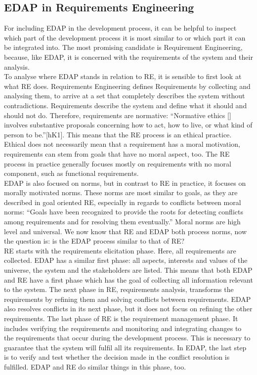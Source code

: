 \subsection*{EDAP in Requirements Engineering}
For including EDAP in the development process, it can be helpful to inspect which part of the development process it is most similar to or which part it can be integrated into. The most promising candidate is Requirement Engineering, because, like EDAP, it is concerned with the requirements of the system and their analysis. \\
To analyse where EDAP stands in relation to RE, it is sensible to first look at what RE does. Requirements Engineering defines Requirements by collecting and analysing them, to arrive at a set that completely describes the system without contradictions. Requirements describe the system and define what it should and should not do. Therefore, requirements are normative: “Normative ethics [] involves substantive proposals concerning how to act, how to live, or what kind of person to be.”[hK1]. This means that the RE process is an ethical practice. Ethical does not necessarily mean that a requirement has a moral motivation, requirements can stem from goals that have no moral aspect, too. The RE process in practice generally focuses mostly on requirements with no moral component, such as functional requirements.\\
EDAP is also focused on norms, but in contrast to RE in practice, it focuses on morally motivated norms. These norms are most similar to goals, as they are described in goal oriented RE, especially in regards to conflicts between moral norms:  “Goals have been recognized to provide the roots for detecting conflicts among requirements and for resolving them eventually.”\cite{van2001goal:2} Moral norms are high level and universal. We now know that RE and EDAP both process norms, now the question is: is the EDAP process similar to that of RE?\\
RE starts with the requirements elicitation phase. Here, all requirements are collected. EDAP has a similar first phase: all aspects, interests and values of the universe, the system and the stakeholders are listed. This means that both EDAP and RE have a first phase which has the goal of collecting all information relevant to the system. The next phase in RE, requirements analysis, transforms the requirements by refining them and solving conflicts between requirements. EDAP also resolves conflicts in its next phase, but it does not focus on refining the other requirements. The last phase of RE is the requirement management phase. It includes verifying the requirements and monitoring and integrating changes to the requirements that occur during the development process. This is necessary to guarantee that the system will fulfil all its requirements. In EDAP, the last step is to verify and test whether the decision made in the conflict resolution is fulfilled. EDAP and RE do similar things in this phase, too. \\
